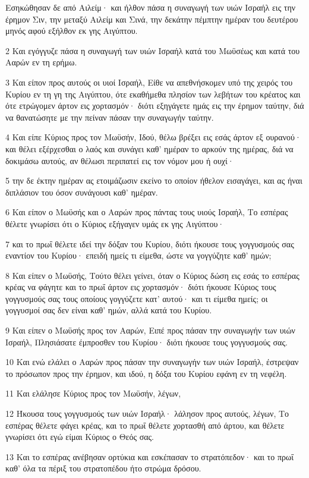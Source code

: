 \par Εσηκώθησαν δε από Αιλείμ· και ήλθον πάσα η συναγωγή των υιών Ισραήλ εις την έρημον Σιν, την μεταξύ Αιλείμ και Σινά, την δεκάτην πέμπτην ημέραν του δευτέρου μηνός αφού εξήλθον εκ γης Αιγύπτου.
\par 2 Και εγόγγυζε πάσα η συναγωγή των υιών Ισραήλ κατά του Μωϋσέως και κατά του Ααρών εν τη ερήμω.
\par 3 Και είπον προς αυτούς οι υιοί Ισραήλ, Είθε να απεθνήσκομεν υπό της χειρός του Κυρίου εν τη γη της Αιγύπτου, ότε εκαθήμεθα πλησίον των λεβήτων του κρέατος και ότε ετρώγομεν άρτον εις χορτασμόν· διότι εξηγάγετε ημάς εις την έρημον ταύτην, διά να θανατώσητε με την πείναν πάσαν την συναγωγήν ταύτην.
\par 4 Και είπε Κύριος προς τον Μωϋσήν, Ιδού, θέλω βρέξει εις εσάς άρτον εξ ουρανού· και θέλει εξέρχεσθαι ο λαός και συνάγει καθ' ημέραν το αρκούν της ημέρας, διά να δοκιμάσω αυτούς, αν θέλωσι περιπατεί εις τον νόμον μου ή ουχί·
\par 5 την δε έκτην ημέραν ας ετοιμάζωσιν εκείνο το οποίον ήθελον εισαγάγει, και ας ήναι διπλάσιον του όσον συνάγουσι καθ' ημέραν.
\par 6 Και είπον ο Μωϋσής και ο Ααρών προς πάντας τους υιούς Ισραήλ, Το εσπέρας θέλετε γνωρίσει ότι ο Κύριος εξήγαγεν υμάς εκ γης Αιγύπτου·
\par 7 και το πρωΐ θέλετε ιδεί την δόξαν του Κυρίου, διότι ήκουσε τους γογγυσμούς σας εναντίον του Κυρίου· επειδή ημείς τι είμεθα, ώστε να γογγύζητε καθ' ημών;
\par 8 Και είπεν ο Μωϋσής, Τούτο θέλει γείνει, όταν ο Κύριος δώση εις εσάς το εσπέρας κρέας να φάγητε και το πρωΐ άρτον εις χορτασμόν· διότι ήκουσε Κύριος τους γογγυσμούς σας τους οποίους γογγύζετε κατ' αυτού· και τι είμεθα ημείς; οι γογγυσμοί σας δεν είναι καθ' ημών, αλλά κατά του Κυρίου.
\par 9 Και είπεν ο Μωϋσής προς τον Ααρών, Ειπέ προς πάσαν την συναγωγήν των υιών Ισραήλ, Πλησιάσατε έμπροσθεν του Κυρίου· διότι ήκουσε τους γογγυσμούς σας.
\par 10 Και ενώ ελάλει ο Ααρών προς πάσαν την συναγωγήν των υιών Ισραήλ, έστρεψαν το πρόσωπον προς την έρημον, και ιδού, η δόξα του Κυρίου εφάνη εν τη νεφέλη.
\par 11 Και ελάλησε Κύριος προς τον Μωϋσήν, λέγων,
\par 12 Ήκουσα τους γογγυσμούς των υιών Ισραήλ· λάλησον προς αυτούς, λέγων, Το εσπέρας θέλετε φάγει κρέας, και το πρωΐ θέλετε χορτασθή από άρτου, και θέλετε γνωρίσει ότι εγώ είμαι Κύριος ο Θεός σας.
\par 13 Και το εσπέρας ανέβησαν ορτύκια και εσκέπασαν το στρατόπεδον· και το πρωΐ καθ' όλα τα πέριξ του στρατοπέδου ήτο στρώμα δρόσου.
